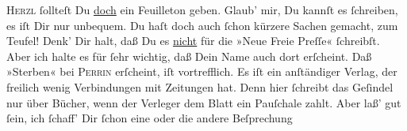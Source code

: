                   \textsc{Herzl}{ }ſollteſt Du \uline{doch} ein Feuilleton geben. Glaub’
               mir, Du kannſt es{ }ſchreiben, es iſt Dir nur unbequem. {\pb}Du haſt doch auch{ }ſchon kürzere Sachen gemacht, zum
               Teufel! Denk’ Dir halt, daß Du es \uline{nicht} für die »Neue Freie Preſſe«{ }ſchreibſt. Aber ich halte es
               für{ }ſehr wichtig, daß Dein Name auch dort erſcheint. Daß »Sterben« bei \textsc{Perrin} erſcheint, iſt vortrefflich. Es iſt ein anſtändiger Verlag, der freilich wenig Verbindungen mit
               Zeitungen hat. Denn hier{ }ſchreibt das Geſindel nur über {\pb}Bücher, wenn der Verleger dem Blatt ein Pauſchale
               zahlt. Aber laß’ gut{ }ſein, ich ſchaff’ Dir{ }ſchon eine oder die andere Beſprechung{\dotssix}\pend
           
